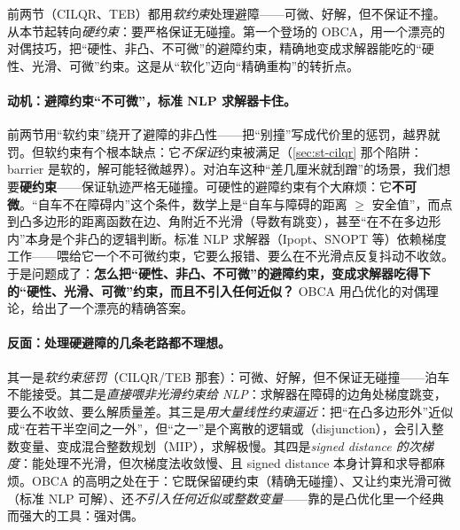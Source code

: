 \begin{note}
前两节（CILQR、TEB）都用\emph{软约束}处理避障——可微、好解，但不保证不撞。从本节起转向\emph{硬约束}：要严格保证无碰撞。第一个登场的 OBCA，用一个漂亮的对偶技巧，把“硬性、非凸、不可微”的避障约束，精确地变成求解器能吃的“硬性、光滑、可微”约束。这是从“软化”迈向“精确重构”的转折点。
\end{note}

\paragraph{动机：避障约束“不可微”，标准 NLP 求解器卡住。}
前两节用“软约束”绕开了避障的非凸性——把“别撞”写成代价里的惩罚，越界就罚。但软约束有个根本缺点：它\emph{不保证}约束被满足（\cref{sec:st-cilqr} 那个陷阱：barrier 是软的，解可能轻微越界）。对泊车这种“差几厘米就刮蹭”的场景，我们想要\textbf{硬约束}——保证轨迹严格无碰撞。可硬性的避障约束有个大麻烦：它\textbf{不可微}。“自车不在障碍内”这个条件，数学上是“自车与障碍的距离 $\ge$ 安全值”，而点到凸多边形的距离函数在边、角附近不光滑（导数有跳变），甚至“在不在多边形内”本身是个非凸的逻辑判断。标准 NLP 求解器（Ipopt、SNOPT 等）依赖梯度工作——喂给它一个不可微约束，它要么报错、要么在不光滑点反复抖动不收敛。于是问题成了：\textbf{怎么把“硬性、非凸、不可微”的避障约束，变成求解器吃得下的“硬性、光滑、可微”约束，而且不引入任何近似？} OBCA 用凸优化的对偶理论，给出了一个漂亮的精确答案。

\paragraph{反面：处理硬避障的几条老路都不理想。}
其一是\emph{软约束惩罚}（CILQR/TEB 那套）：可微、好解，但不保证无碰撞——泊车不能接受。其二是\emph{直接喂非光滑约束给 NLP}：求解器在障碍的边角处梯度跳变，要么不收敛、要么解质量差。其三是\emph{用大量线性约束逼近}：把“在凸多边形外”近似成“在若干半空间之一外”，但“之一”是个离散的逻辑或（disjunction），会引入整数变量、变成混合整数规划（MIP），求解极慢。其四是\emph{signed distance 的次梯度}：能处理不光滑，但次梯度法收敛慢、且 signed distance 本身计算和求导都麻烦。OBCA 的高明之处在于：它既保留硬约束（精确无碰撞）、又让约束光滑可微（标准 NLP 可解）、还\emph{不引入任何近似或整数变量}——靠的是凸优化里一个经典而强大的工具：强对偶。


